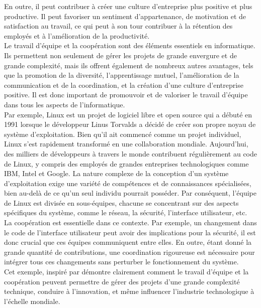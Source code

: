 En outre, il peut contribuer à créer une culture d'entreprise plus positive et plus productive. Il peut favoriser un sentiment d'appartenance, de motivation et de satisfaction au travail, ce qui peut à son tour contribuer à la rétention des employés et à l'amélioration de la productivité.\\

Le travail d'équipe et la coopération sont des éléments essentiels en informatique. Ils permettent non seulement de gérer les projets de grande envergure et de grande complexité, mais ils offrent également de nombreux autres avantages, tels que la promotion de la diversité, l'apprentissage mutuel, l'amélioration de la communication et de la coordination, et la création d'une culture d'entreprise positive. Il est donc important de promouvoir et de valoriser le travail d'équipe dans tous les aspects de l'informatique.\\

Par exemple, Linux est un projet de logiciel libre et open source qui a débuté en 1991 lorsque le développeur Linus Torvalds a décidé de créer son propre noyau de système d'exploitation. Bien qu'il ait commencé comme un projet individuel, Linux s'est rapidement transformé en une collaboration mondiale. Aujourd'hui, des milliers de développeurs à travers le monde contribuent régulièrement au code de Linux, y compris des employés de grandes entreprises technologiques comme IBM, Intel et Google. La nature complexe de la conception d'un système d'exploitation exige une variété de compétences et de connaissances spécialisées, bien au-delà de ce qu'un seul individu pourrait posséder. Par conséquent, l'équipe de Linux est divisée en sous-équipes, chacune se concentrant sur des aspects spécifiques du système, comme le réseau, la sécurité, l'interface utilisateur, etc. \\

La coopération est essentielle dans ce contexte. Par exemple, un changement dans le code de l'interface utilisateur peut avoir des implications pour la sécurité, il est donc crucial que ces équipes communiquent entre elles. En outre, étant donné la grande quantité de contributions, une coordination rigoureuse est nécessaire pour intégrer tous ces changements sans perturber le fonctionnement du système.\\

Cet exemple, inspiré par \cite{torvalds2002just} démontre clairement comment le travail d'équipe et la coopération peuvent permettre de gérer des projets d'une grande complexité technique, conduire à l'innovation, et même influencer l'industrie technologique à l'échelle mondiale.

